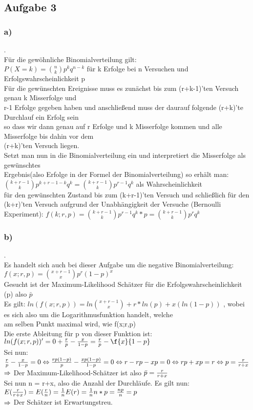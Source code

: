 \documentclass[11pt]{amsart}
\begin{document}
\subsection*{Aufgabe 3}
\subsubsection*{a)}.\\
Für die gewöhnliche Binomialverteilung gilt: \\
\( P(X=k) = \binom{n}{k}p^kq^{n-k} \) für k Erfolge bei n Versuchen und Erfolgswahrscheinlichkeit p\\
Für die gewünschten Ereignisse muss es zunächst bis zum (r+k-1)'ten Versuch genau k Misserfolge und \\
r-1 Erfolge gegeben haben und anschließend muss der daurauf folgende (r+k)'te Durchlauf ein Erfolg sein \\
so dass wir dann genau auf r Erfolge und k Misserfolge kommen und alle Misserfolge bis dahin vor dem \\
(r+k)'ten Versuch liegen. \\
Setzt man nun in die Binomialverteilung ein und interpretiert die Misserfolge als gewünschtes \\
Ergebnis(also Erfolge in der Formel der Binomialverteilung) so erhält man:
 \( \binom{k+r-1}{k}p^{k+r-1 - k}q^k = \binom{k+r-1}{k}p^{r-1}q^k \) als Wahrscheinlichkeit \\
für den gewünschten Zustand bis zum (k+r-1)'ten Versuch und schließlich für den (k+r)'ten Versuch
aufgrund der Unabhängigkeit der Versuche (Bernoulli Experiment): \( f(k;r,p) = \binom{k+r-1}{k}p^{r-1}q^k * p = \binom{k+r-1}{k}p^rq^k \)\\ 
\subsubsection*{b)}.\\
Es handelt sich auch bei dieser Aufgabe um die negative Binomialverteilung: \( f(x;r,p) = \binom{x + r - 1}{x}p^{r}(1-p)^{x} \) \\
Gesucht ist der Maximum-Likelihood Schätzer für die Erfolgswahrscheinlichkeit (p) also $\bar{p}$ \\
Es gilt: \( ln(f(x;r,p)) = ln\binom{x+r-1}{x} + r*ln(p) + x(ln(1-p)) \) , wobei es sich also um die Logarithmusfunktion handelt, welche \\
am selben Punkt maximal wird, wie f(x;r,p) \\
Die erste Ableitung für p von dieser Funktion ist: \( ln(f(x;r,p))' = 0 + \fr{r}{p} - \fr{x}{1-p} = \fr{r}{p} - \f{x}{1-p} \) \\
Sei nun: \( \frac{r}{p} - \frac{x}{1-p} = 0 \Leftrightarrow \frac{rp(1-p)}{p} - \frac{xp(1-p)}{1-p} = 0 \Leftrightarrow r - rp - xp = 0 \Leftrightarrow rp + xp = r \Leftrightarrow p = \frac{r}{r+x} \) \\
$\Rightarrow$ Der Maximum-Likelihood-Schätzer ist also $\bar{p} = \frac{r}{r+x}$ \\
Sei nun n = r+x, also die Anzahl der Durchläufe. Es gilt nun: \( E(\frac{r}{r+x}) = E(\frac{r}{n}) = \frac{1}{n}E(r) = \frac{1}{n}n*p = \frac{np}{n} = p \) \\
$\Rightarrow$ Der Schätzer ist Erwartungstreu.
\end{document}
